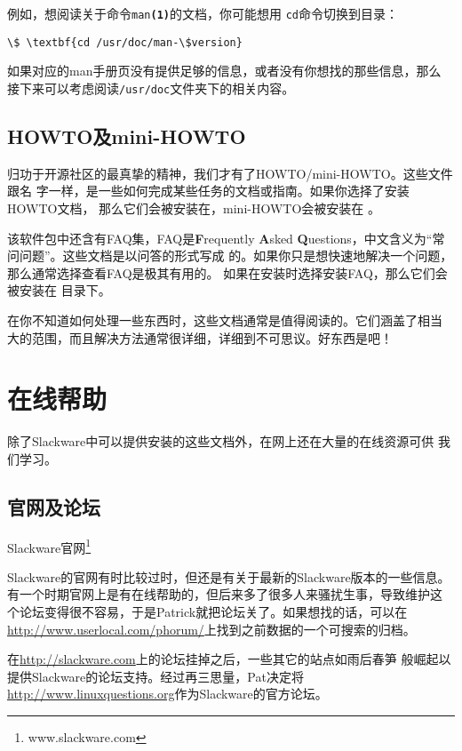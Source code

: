 例如，想阅读关于命令\texttt{man\textbf{(1)}}的文档，你可能想用
\texttt{cd}命令切换到目录：
\begin{Verbatim}[frame=single, commandchars=\\\{\}]
\$ \textbf{cd /usr/doc/man-\$version}
\end{Verbatim}
如果对应的man手册页没有提供足够的信息，或者没有你想找的那些信息，那么
接下来可以考虑阅读\texttt{/usr/doc}文件夹下的相关内容。

\subsection{HOWTO及mini-HOWTO}
\label{sec:help:systemHelp:howto}

归功于开源社区的最真挚的精神，我们才有了HOWTO/mini-HOWTO。这些文件跟名
字一样，是一些如何完成某些任务的文档或指南。如果你选择了安装HOWTO文档，
那么它们会被安装在，mini-HOWTO会被安装在
。

该软件包中还含有FAQ集，FAQ是\textbf{F}requently \textbf{A}sked
\textbf{Q}uestions，中文含义为``常问问题''。这些文档是以问答的形式写成
的。如果你只是想快速地解决一个问题，那么通常选择查看FAQ是极其有用的。
如果在安装时选择安装FAQ，那么它们会被安装在
目录下。

在你不知道如何处理一些东西时，这些文档通常是值得阅读的。它们涵盖了相当
大的范围，而且解决方法通常很详细，详细到不可思议。好东西是吧！

\section{在线帮助}
\label{sec:help:onlineHelp}

除了Slackware中可以提供安装的这些文档外，在网上还在大量的在线资源可供
我们学习。

\subsection{官网及论坛}
\label{sec:help:onlineHelp:website}
Slackware官网\footnote{www.slackware.com}

Slackware的官网有时比较过时，但还是有关于最新的Slackware版本的一些信息。
有一个时期官网上是有在线帮助的，但后来多了很多人来骚扰生事，导致维护这
个论坛变得很不容易，于是Patrick就把论坛关了。如果想找的话，可以在
\url{http://www.userlocal.com/phorum/}上找到之前数据的一个可搜索的归档。

在\url{http://slackware.com}上的论坛挂掉之后，一些其它的站点如雨后春笋
般崛起以提供Slackware的论坛支持。经过再三思量，Pat决定将
\url{http://www.linuxquestions.org}作为Slackware的官方论坛。

